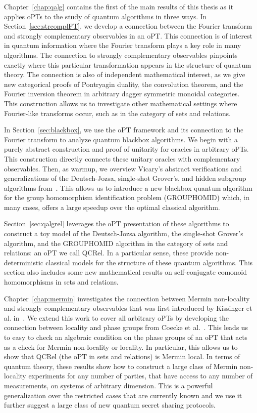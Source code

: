 Chapter~\ref{chap:qalg} contains the first of the main results of this thesis as it applies oPTs to the study of quantum algorithms in three ways.  In Section~\ref{sec:strcomplFT}, we develop a connection between the Fourier transform and strongly complementary observables in an oPT.  This connection is of interest in quantum information where the Fourier transform plays a key role in many algorithms.  The connection to strongly complementary observables pinpoints exactly where this particular transformation appears in the structure of quantum theory.  The connection is also of independent mathematical interest, as we give new categorical proofs of Pontryagin duality, the convolution theorem, and the Fourier inversion theorem in arbitrary dagger symmetric monoidal categories. This construction allows us to investigate other mathematical settings where Fourier-like transforms occur, such as in the category of sets and relations.

In Section~\ref{sec:blackbox}, we use the oPT framework and its connection to the Fourier transform to analyze quantum blackbox algorithms.  We begin with a purely abstract construction and proof of unitarity for oracles in arbitrary oPTs. This construction directly connects these unitary oracles with complementary observables. Then, as warmup, we overview Vicary's abstract verifications and generalizations  of the Deutsch-Jozsa, single-shot Grover's, and hidden subgroup algorithms from~\cite{vicary-tqa}.  This allows us to introduce a new blackbox quantum algorithm for the group homomorphism identification problem (GROUPHOMID) which, in many cases, offers a large speedup over the optimal classical algorithm.

Section~\ref{sec:qalgrel} leverages the oPT presentation of these algorithms to construct a toy model of the Deutsch-Jozsa algorithm, the single-shot Grover's algorithm, and the GROUPHOMID algorithm in the category of sets and relations: an oPT we call QCRel. In a particular sense, these provide non-deterministic classical models for the structure of these quantum algorithms. This section also includes some new mathematical results on self-conjugate comonoid homomorphisms in sets and relations.

Chapter~\ref{chap:mermin} investigates the connection between Mermin non-locality and strongly complementary observables that was first introduced by Kissinger et al. in~\cite{coecke2012strong}. We extend this work to cover all arbitrary oPTs by developing the connection between locality and phase groups from Coecke et al.~\cite{coecke2011phase}. This leads us to easy to check an algebraic condition on the phase groups of an oPT that acts as a check for Mermin non-locality or locality. In particular, this allows us to show that QCRel (the oPT in sets and relations) is Mermin local. In terms of quantum theory, these results show how to construct a large class of Mermin non-locality experiments for any number of parties, that have access to any number of measurements, on systems of arbitrary dimension.  This is a powerful generalization over the restricted cases that are currently known and we use it further suggest a large class of new quantum secret sharing protocols.

